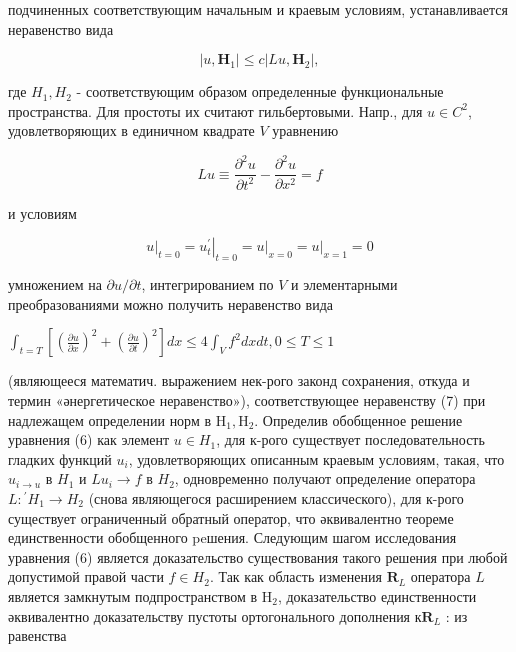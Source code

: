 \documentclass[10pt]{article}
\begin{document}
подчиненных соответствующим начальным и краевым условиям, устанавливается неравенство вида



\[

\left|u, \boldsymbol{H}_{1}\right| \leqslant c\left|L u, \boldsymbol{H}_{2}\right|,

\]



где $H_{1}, H_{2}$ - соответствующим образом определенные функциональные пространства. Для простоты их считают гильбертовыми. Напр., для $u \in C^{2}$, удовлетворяющих в единичном квадрате $V$ уравнению



\[

L u \equiv \frac{\partial^{2} u}{\partial t^{2}}-\frac{\partial^{2} u}{\partial x^{2}}=f

\]



и условиям



\[

\left.u\right|_{t=0}=\left.u_{t}^{\prime}\right|_{t=0}=\left.u\right|_{x=0}=\left.u\right|_{x=1}=0

\]



умножением на $\partial u / \partial t$, интегрированием по $V$ и элементарными преобразованиями можно получить неравенство вида



$\int_{t=T}\left[\left(\frac{\partial u}{\partial x}\right)^{2}+\left(\frac{\partial u}{\partial t}\right)^{2}\right] d x \leqslant 4 \int_{V} f^{2} d x d t, 0 \leqslant T \leqslant 1$



(являющееся математич. выражением нек-рого законд сохранения, откуда и термин «әнергетическое неравенство»), соответствующее неравенству (7) при надлежащем определении норм в $\mathrm{H}_{1}, \mathrm{H}_{2}$. Определив обобщенное решение уравнения (6) как элемент $u \in H_{1}$, для к-рого существует последовательность гладких функций $u_{i}$, удовлетворяющих описанным краевым условиям, такая, что $u_{i \rightarrow u}$ в $H_{1}$ и $L u_{i} \rightarrow f$ в $H_{2}$, одновременно получают определение оператора $L:{ }^{\prime} H_{1} \rightarrow H_{2}$ (снова являющегося расширением классического), для к-рого существует ограниченный обратный оператор, что әквивалентно теореме единственности обобщенного peшения. Следующим шагом исследования уравнения (6) является доказательство существования такого решения при любой допустимой правой части $f \in H_{2}$. Так как область изменения $\boldsymbol{R}_{L}$ оператора $L$ является замкнутым подпространством в $\mathrm{H}_{2}$, доказательство единственности әквивалентно доказательству пустоты ортогонального дополнения $к \boldsymbol{R}_{L}$ : из равенства
\end{document}
